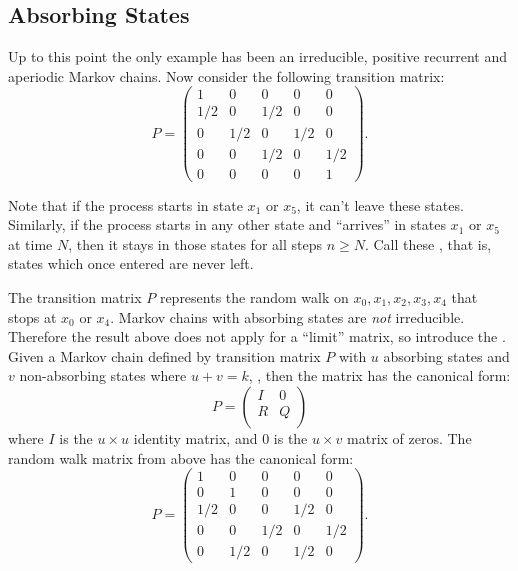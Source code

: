 \documentclass[12pt]{article}
\begin{document}
\subsection*{Absorbing States} Up to this point the only example has
been an irreducible, positive recurrent and aperiodic Markov chains.
Now consider the following transition matrix:
\[
    P =
    \begin{pmatrix}
        1 & 0 & 0 & 0 & 0 \\
        1/2 & 0 & 1/2 & 0 & 0 \\
        0 & 1/2 & 0 & 1/2 & 0 \\
        0 & 0& 1/2 & 0 & 1/2 \\
        0 & 0 & 0 & 0 & 1
    \end{pmatrix}
    .
\]

Note that if the process starts in state \( x_1 \) or \( x_5 \), it
can't leave these states.  Similarly, if the process starts in any other
state and ``arrives'' in states \( x_1 \) or \( x_5 \) at time \( N \),
then it stays in those states for all steps \( n\geq N \).  Call these
,%
that is, states which once entered are never left.

The transition matrix \( P \) represents the random walk on \( {x_0,x_1,x_2,x_3,x_4}
\) that stops at \( x_0 \) or \( x_4 \).  Markov chains with absorbing
states are \emph{not} irreducible.  Therefore the result above does not
apply for a ``limit'' matrix, so introduce the .%
Given a Markov chain defined by transition matrix \( P \) with \( u \)
absorbing states and \( v \) non-absorbing states where \( u + v = k \),
, then the matrix has the canonical form:
\[
    P=
    \begin{pmatrix}
        I & 0 \\
        R & Q \\
    \end{pmatrix}
\] where \( I \) is the \( u\times u \) identity matrix, and \( 0 \) is
the \( u\times v \) matrix of zeros.  The random walk matrix from above
has the canonical form:
\[
    P =
    \begin{pmatrix}
        1 & 0 & 0 & 0 & 0 \\
        0 & 1 & 0 & 0 & 0\\
        1/2 & 0 & 0 & 1/2 & 0 \\
        0 & 0 & 1/2 & 0 & 1/2 \\
        0 & 1/2 & 0 & 1/2 & 0
    \end{pmatrix}
    .
\]
\end{document}
